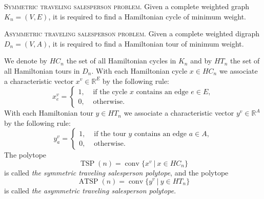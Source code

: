 \documentclass[runningheads]{llncs}
\newcommand{\R}{\mathbb{R}}
\DeclareMathOperator\conv {conv}
\DeclareMathOperator\TSP {TSP}
\DeclareMathOperator\ATSP {ATSP}
\begin{document}
\textsc{Symmetric traveling salesperson problem.} Given a complete weighted graph $K_n=(V,E)$, it is required to find a Hamiltonian cycle of minimum weight.

\textsc{Asymmetric traveling salesperson problem.} Given a complete weighted digraph $D_n=(V,A)$, it is required to find a Hamiltonian tour of minimum weight.


We denote by $HC_n$ the set of all Hamiltonian cycles in $K_n$ and by $HT_n$ the set of all Hamiltonian tours in $D_n$. With each Hamiltonian cycle $x \in HC_n$ we associate a characteristic vector $x^v \in \R^{E}$ by the following rule:
\[
x^v_e = 
\begin{cases}
1,& \text{ if the cycle } x \text{ contains an edge } e \in E,\\
0,& \text{ otherwise. }
\end{cases}
\]
With each Hamiltonian tour $y \in HT_n$ we associate a characteristic vector $y^v \in \R^{A}$ by the following rule:
\[
y^v_a = 
\begin{cases}
1,& \text{ if the tour } y \text{ contains an edge } a \in A,\\
0,& \text{ otherwise. }
\end{cases}
\]
The polytope %
\[\TSP(n) = \conv \{x^v \ | \ x \in HC_n \}\]
is called \textit{the symmetric traveling salesperson polytope},  %
and the polytope %
\[\ATSP(n) = \conv \{y^v \ | \ y \in HT_n \}\]
is called \textit{the asymmetric traveling salesperson polytope}.%
\end{document}
